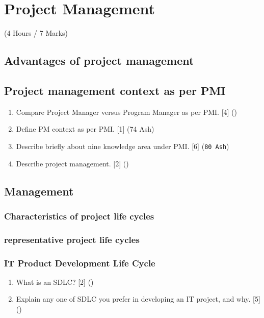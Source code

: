 \documentclass[12pt]{article}
\begin{document}
\pagebreak

\section{Project Management}
  \begin{center}(4 Hours / 7 Marks)\end{center}

  \subsection{Advantages of project management}
  \subsection{Project management context as per PMI}
    \begin{enumerate}
      \item Compare Project Manager versus Program Manager as per PMI. \hfill [4] ()

      \item Define PM context as per PMI. \hfill [1] (74 Ash)

      \item Describe briefly about nine knowledge area under PMI. \hfill [6] (\texttt{80 Ash})
      
      \item Describe project management. \hfill [2] ()
    \end{enumerate}

  \subsection{Management}
  \subsubsection{Characteristics of project life cycles}
  \subsubsection{representative project life cycles}
  \subsubsection{IT Product Development Life Cycle}
    \begin{enumerate}
      \item What is an SDLC? \hfill [2] ()

      \item Explain any one of SDLC you prefer in developing an IT project, and why. \hfill [5] ()
    \end{enumerate}
\end{document}
